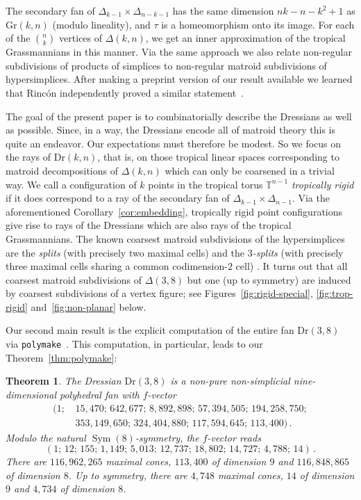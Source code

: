 \documentclass[11pt,a4paper]{amsart}
\DeclareMathOperator{\Sym}{Sym}
\newcommand{\TT}{{\mathbb{T}}}
\newcommand{\Gr}[2]{{\mathrm{Gr}(#1,#2)}}
\newcommand{\Dr}[2]{{\mathrm{Dr}(#1,#2)}}
\theoremstyle{plain}
\newtheorem*{theorem*}{Theorem}
\theoremstyle{definition}
\begin{document}
The secondary fan of $\Delta_{k-1}\times\Delta_{n-k-1}$ has the same dimension $nk-n-k^2+1$ as
$\Gr{k}{n}$ (modulo lineality), and $\tau$ is a homeomorphism onto its image. For each of the
$\binom{n}{k}$ vertices of $\Delta(k,n)$, we get an inner approximation of the tropical
Grassmannians in this manner.  Via the same approach we also relate non-regular subdivisions of
products of simplices to non-regular matroid subdivisions of hypersimplices.  After making a
preprint version of our result available we learned that Rinc\'on independently proved a similar
statement~\cite{Rincon}.

The goal of the present paper is to combinatorially describe the Dressians as well as possible.
Since, in a way, the Dressians encode all of matroid theory this is quite an endeavor.  Our
expectations must therefore be modest.  So we focus on the rays of $\Dr{k}{n}$, that is, on those
tropical linear spaces corresponding to matroid decompositions of $\Delta(k,n)$ which can only be
coarsened in a trivial way.  We call a configuration of $k$ points in the tropical torus $\TT^{n-1}$
\emph{tropically rigid} if it does correspond to a ray of the secondary fan of
$\Delta_{k-1}\times\Delta_{n-1}$.  Via the aforementioned Corollary~\ref{cor:embedding}, tropically
rigid point configurations give rise to rays of the Dressians which are also rays of the tropical
Grassmannians.  The known coarsest matroid subdivisions of the hypersimplices are the \emph{splits}
(with precisely two maximal cells) \cite[Prop.~5.2]{MR2502496} and the \emph{$3$-splits} (with
precisely three maximal cells sharing a common codimension-$2$ cell) \cite[Cor.~6.4]{Herrmann09}.
It turns out that all coarsest matroid subdivisions of $\Delta(3,8)$ but one (up to symmetry) are
induced by coarsest subdivisions of a vertex figure; see Figures~\ref{fig:rigid-special},
\ref{fig:trop-rigid} and~\ref{fig:non-planar} below.

Our second main result is the explicit computation of the entire fan $\Dr{3}{8}$ via
\texttt{poly\-make}~\cite{DMV:polymake}.  This computation, in particular, leads to our
Theorem~\ref{thm:polymake}:

\begin{theorem*}
  The Dressian $\Dr38$ is a non-pure non-simplicial nine-dimensional polyhedral fan with $f$-vector
  \begin{equation*}
    \begin{aligned}
      (1;&\,15,\!470;\,642,\!677;\,8,\!892,\!898 ;\,57,\!394,\!505 ;\,194,\!258,\!750
      ; \\
      &\,353,\!149,\!650 ;\,324,\!404,\!880;\,117,\!594,\!645 ;\,113,\!400 )\,.
    \end{aligned}
  \end{equation*}
  Modulo the natural $\Sym(8)$-symmetry, the $f$-vector reads
  \[
  (1;\,12;\,155;\, 1,\!149;\, 5,\!013;\,12,\!737 ;\,18,\!802 ;\,14,\!727 ;\,4,\!788;\,14)\,.
  \]
  There are $116,\!962,\!265$ maximal cones, $113,\!400$ of dimension $9$ and
  $116,\!848,\!865$ of dimension $8$. Up to symmetry, there are $4,\!748$ maximal cones,
  $14$ of dimension $9$ and $4,\!734$ of dimension $8$.
\end{theorem*}
\end{document}
